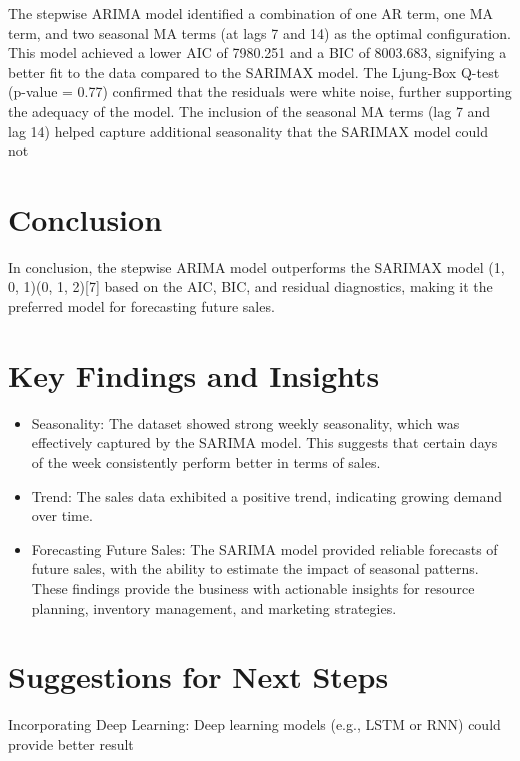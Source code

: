 \documentclass[
  a4paper,
  DIV=11,
  numbers=noendperiod]{scrartcl}
\begin{document}
The stepwise ARIMA model identified a combination of one AR term, one MA
term, and two seasonal MA terms (at lags 7 and 14) as the optimal
configuration. This model achieved a lower AIC of 7980.251 and a BIC of
8003.683, signifying a better fit to the data compared to the SARIMAX
model. The Ljung-Box Q-test (p-value = 0.77) confirmed that the
residuals were white noise, further supporting the adequacy of the
model. The inclusion of the seasonal MA terms (lag 7 and lag 14) helped
capture additional seasonality that the SARIMAX model could not

\section{Conclusion}\label{conclusion}

In conclusion, the stepwise ARIMA model outperforms the SARIMAX model
(1, 0, 1)(0, 1, 2){[}7{]} based on the AIC, BIC, and residual
diagnostics, making it the preferred model for forecasting future sales.

\section{Key Findings and Insights}\label{key-findings-and-insights}

\begin{itemize}
\item
  Seasonality: The dataset showed strong weekly seasonality, which was
  effectively captured by the SARIMA model. This suggests that certain
  days of the week consistently perform better in terms of sales.
\item
  Trend: The sales data exhibited a positive trend, indicating growing
  demand over time.
\item
  Forecasting Future Sales: The SARIMA model provided reliable forecasts
  of future sales, with the ability to estimate the impact of seasonal
  patterns. These findings provide the business with actionable insights
  for resource planning, inventory management, and marketing strategies.
\end{itemize}

\section{Suggestions for Next Steps}\label{suggestions-for-next-steps}

Incorporating Deep Learning: Deep learning models (e.g., LSTM or RNN)
could provide better result
\end{document}
